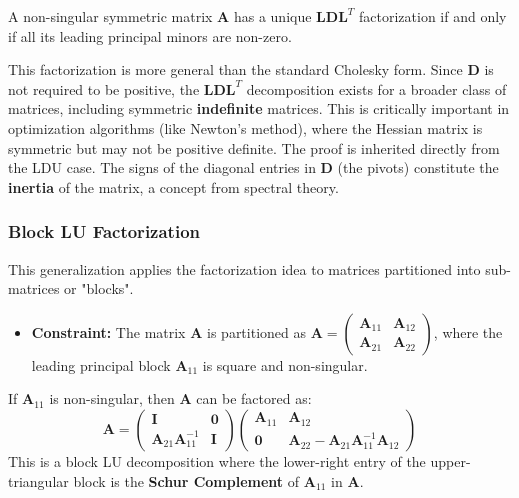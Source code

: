 \begin{theorem}
A non-singular symmetric matrix $\mathbf{A}$ has a unique $\mathbf{L}\mathbf{D}\mathbf{L}^T$ factorization if and only if all its leading principal minors are non-zero.
\end{theorem}

\begin{remark}
This factorization is more general than the standard Cholesky form. Since $\mathbf{D}$ is not required to be positive, the $\mathbf{L}\mathbf{D}\mathbf{L}^T$ decomposition exists for a broader class of matrices, including symmetric \textbf{indefinite} matrices. This is critically important in optimization algorithms (like Newton's method), where the Hessian matrix is symmetric but may not be positive definite. The proof is inherited directly from the LDU case. The signs of the diagonal entries in $\mathbf{D}$ (the pivots) constitute the \textbf{inertia} of the matrix, a concept from spectral theory.
\end{remark}

\subsubsection{Block LU Factorization}
This generalization applies the factorization idea to matrices partitioned into sub-matrices or "blocks".

\begin{itemize}
    \item \textbf{Constraint:} The matrix $\mathbf{A}$ is partitioned as $\mathbf{A} = \begin{pmatrix} \mathbf{A}_{11} & \mathbf{A}_{12} \\ \mathbf{A}_{21} & \mathbf{A}_{22} \end{pmatrix}$, where the leading principal block $\mathbf{A}_{11}$ is square and non-singular.
\end{itemize}

\begin{theorem}
If $\mathbf{A}_{11}$ is non-singular, then $\mathbf{A}$ can be factored as:
\[ \mathbf{A} = 
\begin{pmatrix} \mathbf{I} & \mathbf{0} \\ \mathbf{A}_{21}\mathbf{A}_{11}^{-1} & \mathbf{I} \end{pmatrix}
\begin{pmatrix} \mathbf{A}_{11} & \mathbf{A}_{12} \\ \mathbf{0} & \mathbf{A}_{22} - \mathbf{A}_{21}\mathbf{A}_{11}^{-1}\mathbf{A}_{12} \end{pmatrix}
\]
This is a block LU decomposition where the lower-right entry of the upper-triangular block is the \textbf{Schur Complement} of $\mathbf{A}_{11}$ in $\mathbf{A}$.
\end{theorem}

